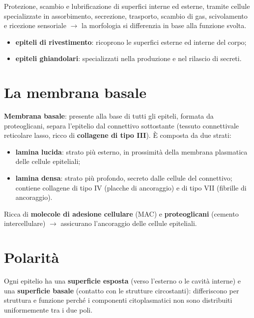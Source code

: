 Protezione, scambio e lubrificazione di superfici interne ed esterne, tramite cellule
specializzate in assorbimento, secrezione, trasporto, scambio di gas, scivolamento e ricezione
sensoriale $\rightarrow$ la morfologia si differenzia in base alla funzione svolta.

\begin{itemize}
  \item \textbf{epiteli di rivestimento}: ricoprono le superfici esterne ed interne del corpo;
  \item \textbf{epiteli ghiandolari}: specializzati nella produzione e nel rilascio di secreti.
\end{itemize}

\section{La membrana basale}

\textbf{Membrana basale}: presente alla base di tutti gli epiteli, formata da proteoglicani,
separa l'epitelio dal connettivo sottostante (tessuto connettivale reticolare lasso, ricco di
\textbf{collagene di tipo III}). È composta da due strati:
\begin{itemize}
  \item \textbf{lamina lucida}: strato più esterno, in prossimità della membrana plasmatica delle
    cellule epiteliali;
  \item \textbf{lamina densa}: strato più profondo, secreto dalle cellule del connettivo;
    contiene collagene di tipo IV (placche di ancoraggio) e di tipo VII (fibrille di ancoraggio).
\end{itemize}
Ricca di \textbf{molecole di adesione cellulare} (MAC) e \textbf{proteoglicani} (cemento
intercellulare) $\rightarrow$ assicurano l'ancoraggio delle cellule epiteliali.

\section{Polarità}

Ogni epitelio ha una \textbf{superficie esposta} (verso l'esterno o le cavità interne) e una
\textbf{superficie basale} (contatto con le strutture circostanti): differiscono per struttura e
funzione perché i componenti citoplasmatici non sono distribuiti uniformemente tra i due poli.

